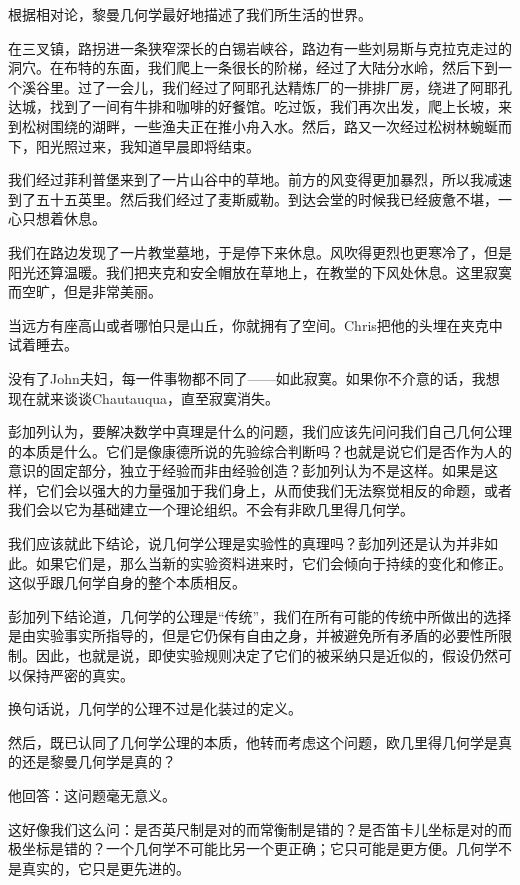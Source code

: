 \documentclass[UTF8]{article}
\begin{document}
\par 根据相对论，黎曼几何学最好地描述了我们所生活的世界。
\par 在三叉镇，路拐进一条狭窄深长的白锡岩峡谷，路边有一些刘易斯与克拉克走过的洞穴。在布特的东面，我们爬上一条很长的阶梯，经过了大陆分水岭，然后下到一个溪谷里。过了一会儿，我们经过了阿耶孔达精炼厂的一排排厂房，绕进了阿耶孔达城，找到了一间有牛排和咖啡的好餐馆。吃过饭，我们再次出发，爬上长坡，来到松树围绕的湖畔，一些渔夫正在推小舟入水。然后，路又一次经过松树林蜿蜒而下，阳光照过来，我知道早晨即将结束。
\par 我们经过菲利普堡来到了一片山谷中的草地。前方的风变得更加暴烈，所以我减速到了五十五英里。然后我们经过了麦斯威勒。到达会堂的时候我已经疲惫不堪，一心只想着休息。
\par 我们在路边发现了一片教堂墓地，于是停下来休息。风吹得更烈也更寒冷了，但是阳光还算温暖。我们把夹克和安全帽放在草地上，在教堂的下风处休息。这里寂寞而空旷，但是非常美丽。
\par 当远方有座高山或者哪怕只是山丘，你就拥有了空间。Chris把他的头埋在夹克中试着睡去。
\par 没有了John夫妇，每一件事物都不同了——如此寂寞。如果你不介意的话，我想现在就来谈谈Chautauqua，直至寂寞消失。
\par 彭加列认为，要解决数学中真理是什么的问题，我们应该先问问我们自己几何公理的本质是什么。它们是像康德所说的先验综合判断吗？也就是说它们是否作为人的意识的固定部分，独立于经验而非由经验创造？彭加列认为不是这样。如果是这样，它们会以强大的力量强加于我们身上，从而使我们无法察觉相反的命题，或者我们会以它为基础建立一个理论组织。不会有非欧几里得几何学。
\par 我们应该就此下结论，说几何学公理是实验性的真理吗？彭加列还是认为并非如此。如果它们是，那么当新的实验资料进来时，它们会倾向于持续的变化和修正。这似乎跟几何学自身的整个本质相反。
\par 彭加列下结论道，几何学的公理是“传统”，我们在所有可能的传统中所做出的选择是由实验事实所指导的，但是它仍保有自由之身，并被避免所有矛盾的必要性所限制。因此，也就是说，即使实验规则决定了它们的被采纳只是近似的，假设仍然可以保持严密的真实。
\par 换句话说，几何学的公理不过是化装过的定义。
\par 然后，既已认同了几何学公理的本质，他转而考虑这个问题，欧几里得几何学是真的还是黎曼几何学是真的？
\par 他回答：这问题毫无意义。
\par 这好像我们这么问：是否英尺制是对的而常衡制是错的？是否笛卡儿坐标是对的而极坐标是错的？一个几何学不可能比另一个更正确；它只可能是更方便。几何学不是真实的，它只是更先进的。
\end{document}
